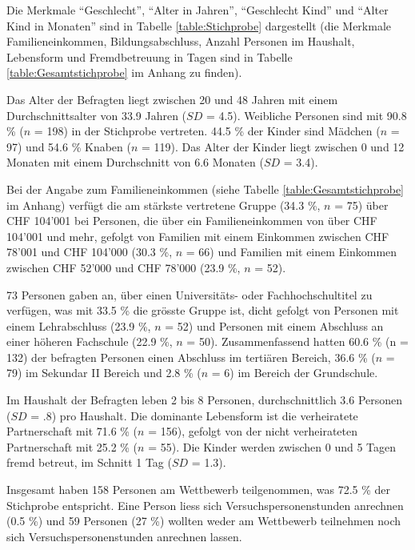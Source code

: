 Die Merkmale \enquote{Geschlecht}, \enquote{Alter in Jahren}, \enquote{Geschlecht Kind} und \enquote{Alter Kind in Monaten} sind in Tabelle \ref{table:Stichprobe} dargestellt (die Merkmale Familieneinkommen, Bildungs\-abschluss, Anzahl Personen im Haushalt, Lebensform und Fremdbetreuung in Tagen sind in Tabelle \ref{table:Gesamtstichprobe} im Anhang zu finden).



Das Alter der Befragten liegt zwischen 20 und 48 Jahren mit einem Durchschnittsalter von 33.9 Jahren ($SD$ = 4.5). Weibliche Personen sind mit 90.8 \% ($n$ = 198) in der Stichprobe vertreten. 44.5 \% der Kinder sind Mädchen ($n$ = 97) und 54.6 \% Knaben ($n$ = 119). Das Alter der Kinder liegt zwischen 0 und 12 Monaten mit einem Durchschnitt von 6.6 Monaten ($SD$ = 3.4).

Bei der Angabe zum Familieneinkommen (siehe Tabelle \ref{table:Gesamtstichprobe} im Anhang) verfügt die am stärkste vertretene Gruppe (34.3 \%, $n$ = 75) über CHF 104’001 bei Personen, die über ein Familieneinkommen von über CHF 104'001 und mehr, gefolgt von Familien mit einem Einkommen zwischen CHF 78'001 und CHF 104'000 (30.3 \%, $n$ = 66) und Familien mit einem Einkommen zwischen CHF 52'000 und CHF 78'000 (23.9 \%, $n$ = 52). 

73 Personen gaben an, über einen Universitäts- oder Fachhochschultitel zu verfügen, was mit 33.5 \% die grösste Gruppe ist, dicht gefolgt von Personen mit einem Lehrabschluss (23.9 \%, $n$ = 52) und Personen mit einem Abschluss an einer höheren Fachschule (22.9 \%, $n$ = 50). Zusammenfassend hatten 60.6 \% (n = 132) der befragten Personen einen Abschluss im tertiären Bereich, 36.6 \% ($n$ = 79) im Sekundar II Bereich und 2.8 \% ($n$ = 6) im Bereich der Grundschule.

Im Haushalt der Befragten leben 2 bis 8 Personen, durchschnittlich 3.6 Personen ($SD$ = .8) pro Haushalt. Die dominante Lebensform ist die verheiratete Partnerschaft mit 71.6 \% ($n$ = 156), gefolgt von der nicht verheirateten Partnerschaft mit 25.2 \% ($n$ = 55). Die Kinder werden zwischen 0 und 5 Tagen fremd betreut, im Schnitt 1 Tag ($SD$ = 1.3).

Insgesamt haben 158 Personen am Wettbewerb teilgenommen, was 72.5 \% der Stichprobe entspricht. Eine Person liess sich Versuchspersonenstunden anrechnen (0.5 \%) und 59 Personen (27 \%) wollten weder am Wettbewerb teilnehmen noch sich Versuchspersonenstunden anrechnen lassen.



